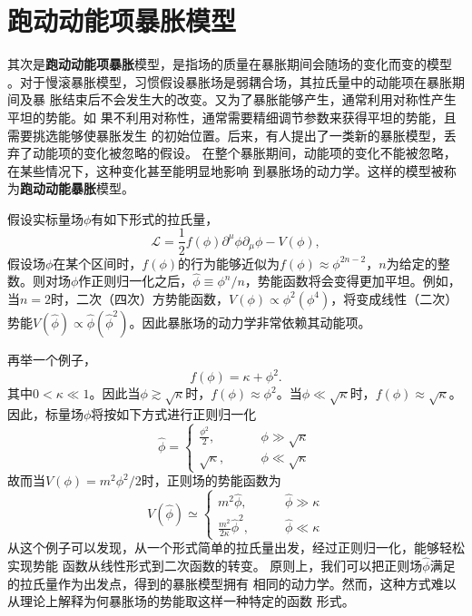 \section{跑动动能项暴胀模型}
其次是\textbf{跑动动能项暴胀}模型，是指场的质量在暴胀期间会随场的变化而变的模型
。对于慢滚暴胀模型，习惯假设暴胀场是弱耦合场，其拉氏量中的动能项在暴胀期间及暴
胀结束后不会发生大的改变。又为了暴胀能够产生，通常利用对称性产生平坦的势能。如
果不利用对称性，通常需要精细调节参数来获得平坦的势能，且需要挑选能够使暴胀发生
的初始位置。后来，有人提出了一类新的暴胀模型，丢弃了动能项的变化被忽略的假设。
在整个暴胀期间，动能项的变化不能被忽略，在某些情况下，这种变化甚至能明显地影响
到暴胀场的动力学。这样的模型被称为\textbf{跑动动能暴胀}模型。

假设实标量场$\phi$有如下形式的拉氏量，
\begin{equation}
  \mathcal{L} =
  \frac{1}{2}f(\phi)\partial^{\mu}\phi\partial_{\mu}\phi-V(\phi),
\end{equation}
假设场$\phi$在某个区间时，$f(\phi)$的行为能够近似为$f(\phi)\approx
\phi^{2n-2}$，$n$为给定的整数。则对场$\phi$作正则归一化之后，$\hat{\phi}\equiv
\phi^{n}/n$，势能函数将会变得更加平坦。例如，当$n=2$时，二次（四次）方势能函数，$V(\phi)\propto
\phi^2(\phi^{4})$，将变成线性（二次）势能$V(\hat{\phi})\propto
\hat{\phi}(\hat{\phi}^2)$。因此暴胀场的动力学非常依赖其动能项。

再举一个例子，
\begin{equation}
  f(\phi) = \kappa + \phi^2. 
\end{equation}
其中$0 < \kappa \ll 1$。因此当$\phi \gtrsim \sqrt{\kappa}$时，$f(\phi)
\approx \phi^2$。当$\phi \ll \sqrt{\kappa}$时，$f(\phi)\approx
\sqrt{\kappa}$。因此，标量场$\phi$将按如下方式进行正则归一化
\begin{equation}
  \hat{\phi} = 
  \begin{cases}
    \frac{\phi^2}{2}, \qquad & \phi \gg \sqrt{\kappa} \\
    \sqrt{\kappa},\qquad & \phi \ll \sqrt{\kappa}
  \end{cases}
\end{equation}
故而当$V(\phi)=m^2\phi^2/ 2$时，正则场的势能函数为
\begin{equation}
  V(\hat{\phi}) \simeq 
  \begin{cases}
    m^2\hat{\phi},\qquad & \hat{\phi} \gg \kappa \\
    \frac{m^2}{2\kappa} \hat{\phi}^2,\qquad & \hat{\phi} \ll \kappa
  \end{cases}
\end{equation}
从这个例子可以发现，从一个形式简单的拉氏量出发，经过正则归一化，能够轻松实现势能
函数从线性形式到二次函数的转变。
原则上，我们可以把正则场$\hat{\phi}$满足的拉氏量作为出发点，得到的暴胀模型拥有
相同的动力学。然而，这种方式难以从理论上解释为何暴胀场的势能取这样一种特定的函数
形式。


